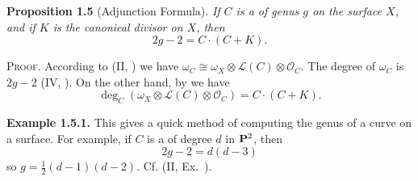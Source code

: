 {\medskip
\noindent\hypertarget{result-V-1.5}{}\textbf{Proposition 1.5} (Adjunction Formula). \emph{If $C$ is a  of genus $g$ on the surface $X$, and if $K$ is the canonical divisor on $X$, then}
\[
2g-2=C\cdot(C+K).
\]

\smallskip
\noindent\textsc{Proof.} According to (II, ) we have $\omega_C\cong\omega_X\otimes\mathcal L(C)\otimes\mathcal O_C$. The degree of $\omega_C$ is $2g-2$ (IV, ). On the other hand, by  we have
\[
\deg_C(\omega_X\otimes\mathcal L(C)\otimes\mathcal O_C)=C\cdot(C+K).
\]

\medskip
\noindent\hypertarget{result-V-1.5.1}{}\textbf{Example 1.5.1.} This gives a quick method of computing the genus of a curve on a surface. For example, if $C$ is a  of degree $d$ in $\mathbf{P}^2$, then
\[
2g-2=d(d-3)
\]
so $g=\tfrac12(d-1)(d-2)$. Cf. (II, Ex.~).
}
